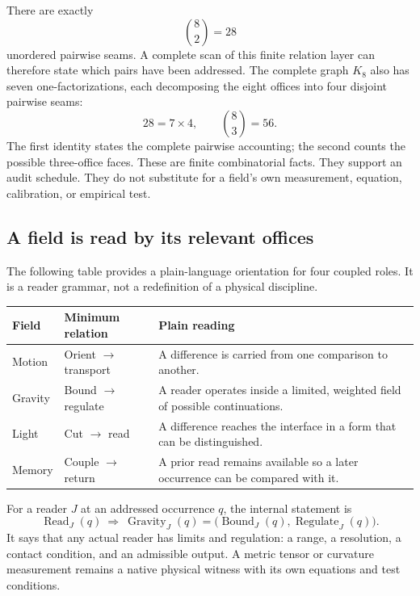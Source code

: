 \documentclass[11pt]{article}
\newcommand{\readerread}{\operatorname{Read}}
\begin{document}
There are exactly
\begin{equation}
\binom{8}{2}=28
\end{equation}
unordered pairwise seams. A complete scan of this finite relation layer can therefore state which pairs have been addressed. The complete graph $K_8$ also has seven one-factorizations, each decomposing the eight offices into four disjoint pairwise seams:
\begin{equation}
28=7\times4,\qquad \binom{8}{3}=56.
\end{equation}
The first identity states the complete pairwise accounting; the second counts the possible three-office faces. These are finite combinatorial facts. They support an audit schedule. They do not substitute for a field's own measurement, equation, calibration, or empirical test.

\subsection{A field is read by its relevant offices}
The following table provides a plain-language orientation for four coupled roles. It is a reader grammar, not a redefinition of a physical discipline.

\begin{center}
\begin{tabularx}{\textwidth}{@{}p{}Y Y@{}}
\toprule
\textbf{Field} & \textbf{Minimum relation} & \textbf{Plain reading}\\
\midrule
Motion & Orient $\rightarrow$ transport & A difference is carried from one comparison to another.\\
Gravity & Bound $\rightarrow$ regulate & A reader operates inside a limited, weighted field of possible continuations.\\
Light & Cut $\rightarrow$ read & A difference reaches the interface in a form that can be distinguished.\\
Memory & Couple $\rightarrow$ return & A prior read remains available so a later occurrence can be compared with it.\\
\bottomrule
\end{tabularx}
\end{center}

For a reader $J$ at an addressed occurrence $q$, the internal statement is
\begin{equation}
\readerread_J(q)\ \Longrightarrow\ \operatorname{Gravity}_J(q)
=\bigl(\operatorname{Bound}_J(q),\operatorname{Regulate}_J(q)\bigr).
\label{eq:readergravity}
\end{equation}
It says that any actual reader has limits and regulation: a range, a resolution, a contact condition, and an admissible output. A metric tensor or curvature measurement remains a native physical witness with its own equations and test conditions.
\end{document}
